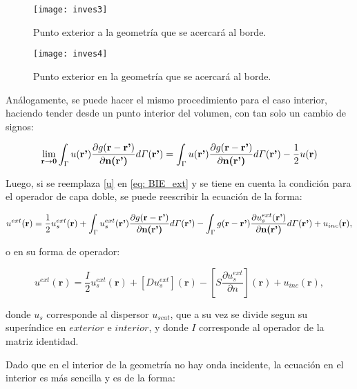\documentclass[12pt,letterpaper]{article}
\numberwithin{equation}{section}
\begin{document}
\begin{figure}[H]
	\centering
	\texttt{[image: inves3]}
	\caption{Punto exterior a la geometría que se acercará al borde. \cite{paperBEMpp} }
	\label{inci1}
\end{figure}

\begin{figure}[H]
	\centering
	\texttt{[image: inves4]}
	\caption{Punto exterior en la geometría que se acercará al borde. \cite{paperBEMpp} }
	\label{inci2}
\end{figure}

Análogamente, se puede hacer el mismo procedimiento para el caso interior, haciendo tender desde un punto interior del volumen, con tan solo un cambio de signos:

$$\lim\limits_{\textbf{r}\rightarrow \textbf{0}}\int_{\Gamma}u(\textbf{r'})\frac{\partial g(\textbf{r}-\textbf{r'})}{\partial\textbf{n(\textbf{r'})}}d\varGamma(\textbf{r'})=\int_{\Gamma}u(\textbf{r'})\frac{\partial g(\textbf{r}-\textbf{r'})}{\partial\textbf{n(\textbf{r'})}}d\varGamma(\textbf{r'}) - \frac{1}{2}u(\textbf{r})$$

Luego, si se reemplaza \ref{u} en \ref{eq: BIE_ext} y se tiene en cuenta la condición para el operador de capa doble, se puede reescribir la ecuación de la forma:

\begin{equation}
u^{ext}(\textbf{r}) = \frac{1}{2}u_s^{ext}(\textbf{r}) + \int_{\Gamma}u_s^{ext}(\textbf{r'})\frac{\partial g(\textbf{r}-\textbf{r'})}{\partial\textbf{n(\textbf{r'})}}d\varGamma(\textbf{r'}) - \int_{\Gamma}g(\textbf{r}-\textbf{r'})\frac{\partial u_s^{ext}(\textbf{r'})}{\partial\textbf{n(\textbf{r'})}}d\varGamma(\textbf{r'}) +  u_{inc}(\textbf{r}),
\label{eq: BIE_borde}	
\end{equation}

\noindent o en su forma de operador:

\begin{equation}
	u^{ext}(\textbf{r})=\frac{I}{2}u_s^{ext}(\textbf{r}) + \left[D u_s^{ext}\right](\textbf{r}) - \left[S \frac{\partial u_s^{ext}}{\partial n}\right](\textbf{r}) + u_{inc}(\textbf{r}),
\label{eq: sol us + uinc (ext)}
\end{equation}

\noindent donde $u_{s}$ corresponde al dispersor $u_{scat}$, que a su vez se divide segun su superíndice en $exterior$ e $interior$, y donde $I$ corresponde al operador de la matriz identidad.

Dado que en el interior de la geometría no hay onda incidente, la ecuación en el interior es más sencilla y es de la forma:
\end{document}
